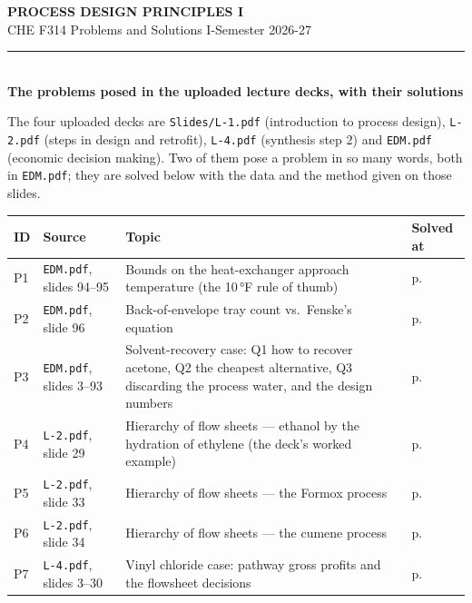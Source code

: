 \documentclass[10pt,a4paper]{article}
\newcommand{\spsub}[1]{\par\addvspace{7pt}\noindent{\color{accent}\bfseries #1}\par\addvspace{3pt}\nopagebreak}
\begin{document}
\begin{center}
{\LARGE\bfseries\color{accent} PROCESS DESIGN PRINCIPLES I}\\[2pt]
{\color{accent2} CHE F314 \textperiodcentered{} Problems and Solutions \textperiodcentered{} I-Semester 2026-27}\\[4pt]
{\color{rule}\rule{0.6\linewidth}{0.8pt}}\\[6pt]
{\large\bfseries\color{accent} The problems posed in the uploaded lecture decks, with their solutions}
\end{center}

\vspace{1mm}
The four uploaded decks are \texttt{Slides/L-1.pdf} (introduction to process design),
\texttt{L-2.pdf} (steps in design and retrofit), \texttt{L-4.pdf} (synthesis step 2) and
\texttt{EDM.pdf} (economic decision making). Two of them pose a problem in so many words, both in
\texttt{EDM.pdf}; they are solved below with the data and the method given on those slides.

\spsub{Problem inventory}
{\small
\begin{tabularx}{\linewidth}{@{}l l X l@{}}
\toprule
\textbf{ID} & \textbf{Source} & \textbf{Topic} & \textbf{Solved at}\\
\midrule
P1 & \texttt{EDM.pdf}, slides 94--95 & Bounds on the heat-exchanger approach temperature (the 10\,\si{\degree}F rule of thumb) & p.\,\pageref{p:1}\\
P2 & \texttt{EDM.pdf}, slide 96 & Back-of-envelope tray count vs.\ Fenske's equation & p.\,\pageref{p:2}\\
P3 & \texttt{EDM.pdf}, slides 3--93 & Solvent-recovery case: Q1 how to recover acetone, Q2 the cheapest alternative, Q3 discarding the process water, and the design numbers & p.\,\pageref{p:3}\\
P4 & \texttt{L-2.pdf}, slide 29 & Hierarchy of flow sheets --- ethanol by the hydration of ethylene (the deck's worked example) & p.\,\pageref{p:4}\\
P5 & \texttt{L-2.pdf}, slide 33 & Hierarchy of flow sheets --- the Formox process & p.\,\pageref{p:5}\\
P6 & \texttt{L-2.pdf}, slide 34 & Hierarchy of flow sheets --- the cumene process & p.\,\pageref{p:6}\\
P7 & \texttt{L-4.pdf}, slides 3--30 & Vinyl chloride case: pathway gross profits and the flowsheet decisions & p.\,\pageref{p:7}\\
\bottomrule
\end{tabularx}}
\end{document}
